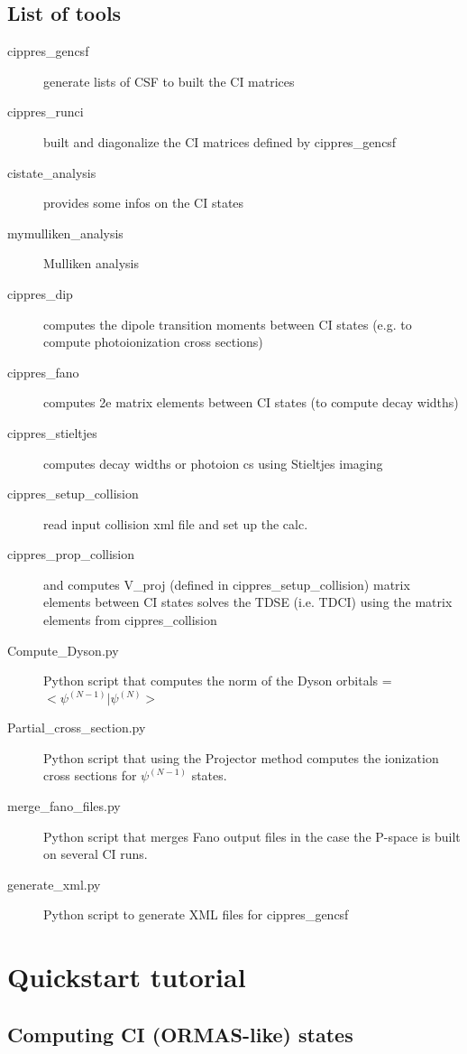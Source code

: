 \documentclass[a4paper, 10 pt]{report}
\begin{document}
\section{List of tools}
\begin{description}
	\item[cippres\_gencsf] generate lists of CSF to built the CI matrices
	\item[cippres\_runci] built and diagonalize the CI matrices defined by cippres\_gencsf
	\item[cistate\_analysis] provides some infos on the CI states
	\item[mymulliken\_analysis] Mulliken analysis
	\item[cippres\_dip] computes the dipole transition moments between CI states (e.g. to compute photoionization cross sections)
    \item[cippres\_fano] computes 2e matrix elements between CI states (to compute decay widths)
    \item[cippres\_stieltjes] computes decay widths or photoion cs using Stieltjes imaging
    \item[cippres\_setup\_collision] read input collision xml file and set up the calc.	
	\item[cippres\_prop\_collision] and computes V\_proj (defined in cippres\_setup\_collision) matrix elements between CI states solves the TDSE (i.e. TDCI) using the matrix elements from cippres\_collision
	\item[Compute\_Dyson.py] Python script that computes the norm of the Dyson orbitals = $<\psi^{(N-1)}|\psi^{(N)}>$
	\item[Partial\_cross\_section.py] Python script that using the Projector method computes the ionization cross sections for $\psi^{(N-1)}$ states.
	\item[merge\_fano\_files.py]  Python script that merges Fano output files in the case the P-space is built on several CI runs.
	\item[generate\_xml.py] Python script to generate XML files for cippres\_gencsf
\end{description}

\newpage

\chapter{Quickstart tutorial}

\section{Computing CI (ORMAS-like) states}
\end{document}

